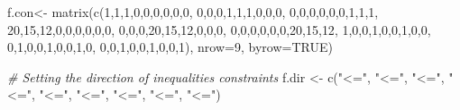 \documentclass[
]{article}
\newenvironment{Shaded}{\begin{snugshade}}{\end{snugshade}}
\newcommand{\AttributeTok}[1]{\textcolor[rgb]{0.77,0.63,0.00}{#1}}
\newcommand{\CommentTok}[1]{\textcolor[rgb]{0.56,0.35,0.01}{\textit{#1}}}
\newcommand{\ConstantTok}[1]{\textcolor[rgb]{0.00,0.00,0.00}{#1}}
\newcommand{\DecValTok}[1]{\textcolor[rgb]{0.00,0.00,0.81}{#1}}
\newcommand{\FunctionTok}[1]{\textcolor[rgb]{0.00,0.00,0.00}{#1}}
\newcommand{\NormalTok}[1]{#1}
\newcommand{\OtherTok}[1]{\textcolor[rgb]{0.56,0.35,0.01}{#1}}
\newcommand{\StringTok}[1]{\textcolor[rgb]{0.31,0.60,0.02}{#1}}
\begin{document}
\begin{Shaded}
\begin{Highlighting}[]
\NormalTok{f.con}\OtherTok{\textless{}{-}} \FunctionTok{matrix}\NormalTok{(}\FunctionTok{c}\NormalTok{(}\DecValTok{1}\NormalTok{,}\DecValTok{1}\NormalTok{,}\DecValTok{1}\NormalTok{,}\DecValTok{0}\NormalTok{,}\DecValTok{0}\NormalTok{,}\DecValTok{0}\NormalTok{,}\DecValTok{0}\NormalTok{,}\DecValTok{0}\NormalTok{,}\DecValTok{0}\NormalTok{,}
                 \DecValTok{0}\NormalTok{,}\DecValTok{0}\NormalTok{,}\DecValTok{0}\NormalTok{,}\DecValTok{1}\NormalTok{,}\DecValTok{1}\NormalTok{,}\DecValTok{1}\NormalTok{,}\DecValTok{0}\NormalTok{,}\DecValTok{0}\NormalTok{,}\DecValTok{0}\NormalTok{,}
                 \DecValTok{0}\NormalTok{,}\DecValTok{0}\NormalTok{,}\DecValTok{0}\NormalTok{,}\DecValTok{0}\NormalTok{,}\DecValTok{0}\NormalTok{,}\DecValTok{0}\NormalTok{,}\DecValTok{1}\NormalTok{,}\DecValTok{1}\NormalTok{,}\DecValTok{1}\NormalTok{,}
                 \DecValTok{20}\NormalTok{,}\DecValTok{15}\NormalTok{,}\DecValTok{12}\NormalTok{,}\DecValTok{0}\NormalTok{,}\DecValTok{0}\NormalTok{,}\DecValTok{0}\NormalTok{,}\DecValTok{0}\NormalTok{,}\DecValTok{0}\NormalTok{,}\DecValTok{0}\NormalTok{,}
                 \DecValTok{0}\NormalTok{,}\DecValTok{0}\NormalTok{,}\DecValTok{0}\NormalTok{,}\DecValTok{20}\NormalTok{,}\DecValTok{15}\NormalTok{,}\DecValTok{12}\NormalTok{,}\DecValTok{0}\NormalTok{,}\DecValTok{0}\NormalTok{,}\DecValTok{0}\NormalTok{,}
                 \DecValTok{0}\NormalTok{,}\DecValTok{0}\NormalTok{,}\DecValTok{0}\NormalTok{,}\DecValTok{0}\NormalTok{,}\DecValTok{0}\NormalTok{,}\DecValTok{0}\NormalTok{,}\DecValTok{20}\NormalTok{,}\DecValTok{15}\NormalTok{,}\DecValTok{12}\NormalTok{,}
                 \DecValTok{1}\NormalTok{,}\DecValTok{0}\NormalTok{,}\DecValTok{0}\NormalTok{,}\DecValTok{1}\NormalTok{,}\DecValTok{0}\NormalTok{,}\DecValTok{0}\NormalTok{,}\DecValTok{1}\NormalTok{,}\DecValTok{0}\NormalTok{,}\DecValTok{0}\NormalTok{,}
                 \DecValTok{0}\NormalTok{,}\DecValTok{1}\NormalTok{,}\DecValTok{0}\NormalTok{,}\DecValTok{0}\NormalTok{,}\DecValTok{1}\NormalTok{,}\DecValTok{0}\NormalTok{,}\DecValTok{0}\NormalTok{,}\DecValTok{1}\NormalTok{,}\DecValTok{0}\NormalTok{,}
                 \DecValTok{0}\NormalTok{,}\DecValTok{0}\NormalTok{,}\DecValTok{1}\NormalTok{,}\DecValTok{0}\NormalTok{,}\DecValTok{0}\NormalTok{,}\DecValTok{1}\NormalTok{,}\DecValTok{0}\NormalTok{,}\DecValTok{0}\NormalTok{,}\DecValTok{1}\NormalTok{), }\AttributeTok{nrow=}\DecValTok{9}\NormalTok{, }\AttributeTok{byrow=}\ConstantTok{TRUE}\NormalTok{)}

\CommentTok{\# Setting the direction of inequalities constraints}
\NormalTok{f.dir }\OtherTok{\textless{}{-}} \FunctionTok{c}\NormalTok{(}\StringTok{"\textless{}="}\NormalTok{,}
           \StringTok{"\textless{}="}\NormalTok{,}
           \StringTok{"\textless{}="}\NormalTok{,}
           \StringTok{"\textless{}="}\NormalTok{,}
           \StringTok{"\textless{}="}\NormalTok{,}
           \StringTok{"\textless{}="}\NormalTok{,}
           \StringTok{"\textless{}="}\NormalTok{,}
           \StringTok{"\textless{}="}\NormalTok{,}
           \StringTok{"\textless{}="}\NormalTok{)}


\end{Highlighting}
\end{Shaded}
\end{document}
